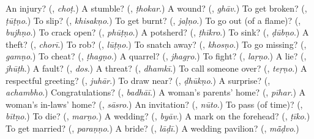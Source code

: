 \begin{tcolorbox}[breakable,colback=teal!4,colframe=teal!35!black,title={Before you move on}]
An injury? (\textbf{}, \emph{choṭ}.) A stumble? (\textbf{}, \emph{ṭhokar}.) A wound? (\textbf{}, \emph{ghāv}.) To get broken? (\textbf{}, \emph{ṭūṭṇo}.) To slip? (\textbf{}, \emph{khisakṇo}.) To get burnt? (\textbf{}, \emph{jaḷṇo}.) To go out (of a flame)? (\textbf{}, \emph{bujhṇo}.) To crack open? (\textbf{}, \emph{phūṭṇo}.) A potsherd? (\textbf{}, \emph{ṭhīkro}.) To sink? (\textbf{}, \emph{ḍūbṇo}.) A theft? (\textbf{}, \emph{chorī}.) To rob? (\textbf{}, \emph{lūṭṇo}.) To snatch away? (\textbf{}, \emph{khosṇo}.) To go missing? (\textbf{}, \emph{gamṇo}.) To cheat? (\textbf{}, \emph{ṭhagṇo}.) A quarrel? (\textbf{}, \emph{jhagṛo}.) To fight? (\textbf{}, \emph{laṛṇo}.) A lie? (\textbf{}, \emph{jhūṭh}.) A fault? (\textbf{}, \emph{dos}.) A threat? (\textbf{}, \emph{dhamkī}.) To call someone over? (\textbf{}, \emph{teṛṇo}.) A respectful greeting? (\textbf{}, \emph{juhār}.) To draw near? (\textbf{}, \emph{ḍhūkṇo}.) A surprise? (\textbf{}, \emph{achambho}.) Congratulations? (\textbf{}, \emph{badhāī}.) A woman's parents' home? (\textbf{}, \emph{pīhar}.) A woman's in-laws' home? (\textbf{}, \emph{sāsro}.) An invitation? (\textbf{}, \emph{nūto}.) To pass (of time)? (\textbf{}, \emph{bītṇo}.) To die? (\textbf{}, \emph{marṇo}.) A wedding? (\textbf{}, \emph{byāv}.) A mark on the forehead? (\textbf{}, \emph{ṭīko}.) To get married? (\textbf{}, \emph{paraṇṇo}.) A bride? (\textbf{}, \emph{lāḍī}.) A wedding pavilion? (\textbf{}, \emph{mā̃ḍvo}.)
\end{tcolorbox}
